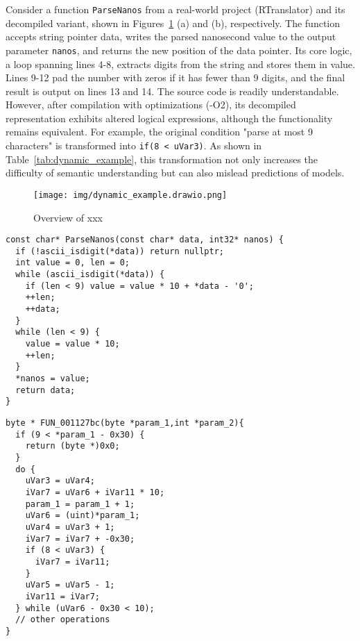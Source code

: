 \documentclass[acmsmall,screen,review,anonymous]{acmart} %
\begin{document}
Consider a function \lstinline{ParseNanos} from a real-world project (RTranslator) and its decompiled variant, shown in Figures~\ref{fig:dynamic_example} (a) and (b), respectively. The function accepts string pointer data, writes the parsed nanosecond value to the output parameter \lstinline{nanos}, and returns the new position of the data pointer. Its core logic, a loop spanning lines 4-8, extracts digits from the string and stores them in value. Lines 9-12 pad the number with zeros if it has fewer than 9 digits, and the final result is output on lines 13 and 14. The source code is readily understandable. However, after compilation with optimizations (-O2), its decompiled representation exhibits altered logical expressions, although the functionality remains equivalent. For example, the original condition "parse at most 9 characters" is transformed into \lstinline{if(8 < uVar3)}. As shown in Table~\ref{tab:dynamic_example}, this transformation not only increases the difficulty of semantic understanding but can also mislead predictions of models.

\begin{figure}[h] %
    \centering
    \texttt{[image: img/dynamic\_example.drawio.png]} %
    \caption{Overview of xxx } %
    \label{fig:dynamic_example} %
\end{figure}

\begin{minipage}[t]{0.45\textwidth}
\begin{lstlisting}[caption={ParseNanos},
basicstyle=\ttfamily\scriptsize,
keywordstyle=\color{magenta}\bfseries\scriptsize,
commentstyle=\color{teal}\itshape\scriptsize]
const char* ParseNanos(const char* data, int32* nanos) {
  if (!ascii_isdigit(*data)) return nullptr;
  int value = 0, len = 0;
  while (ascii_isdigit(*data)) {
    if (len < 9) value = value * 10 + *data - '0';
    ++len;
    ++data;
  }
  while (len < 9) {
    value = value * 10;
    ++len;
  }
  *nanos = value;
  return data;
}
\end{lstlisting}
\end{minipage}
\hfill
\begin{minipage}[t]{0.45\textwidth}
\begin{lstlisting}[caption={Decompiled counterpart of ParseNanos},
basicstyle=\ttfamily\scriptsize,
keywordstyle=\color{magenta}\bfseries\scriptsize,
commentstyle=\color{teal}\itshape\scriptsize]
byte * FUN_001127bc(byte *param_1,int *param_2){
  if (9 < *param_1 - 0x30) {
    return (byte *)0x0;
  }
  do {
    uVar3 = uVar4;
    iVar7 = uVar6 + iVar11 * 10;
    param_1 = param_1 + 1;
    uVar6 = (uint)*param_1;
    uVar4 = uVar3 + 1;
    iVar7 = iVar7 + -0x30;
    if (8 < uVar3) {
      iVar7 = iVar11;
    }
    uVar5 = uVar5 - 1;
    iVar11 = iVar7;
  } while (uVar6 - 0x30 < 10);
  // other operations
}
\end{lstlisting}
\end{minipage}
\end{document}
